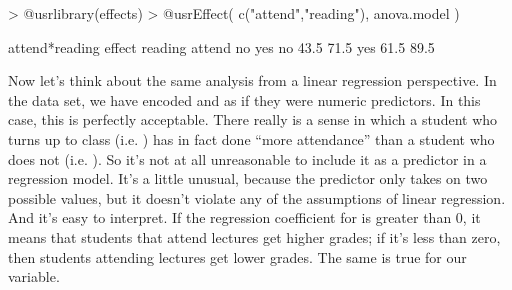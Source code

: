 \begin{rblock1}
> @usr{library(effects)}
> @usr{Effect( c("attend","reading"), anova.model )}

 attend*reading effect
      reading
attend   no  yes
   no  43.5 71.5
   yes 61.5 89.5
\end{rblock1}


Now let's think about the same analysis from a linear regression perspective. In the  data set, we have encoded  and  as if they were numeric predictors. In this case, this is perfectly acceptable. There really is a sense in which a student who turns up to class (i.e. ) has in fact done ``more attendance'' than a student who does not (i.e. ). So it's not at all unreasonable to include it as a predictor in a regression model. It's a little unusual, because the predictor only takes on two possible values, but it doesn't violate any of the assumptions of linear regression. And it's easy to interpret. If the regression coefficient for  is greater than 0, it means that students that attend lectures get higher grades; if it's less than zero, then students attending lectures get lower grades. The same is true for our  variable.

